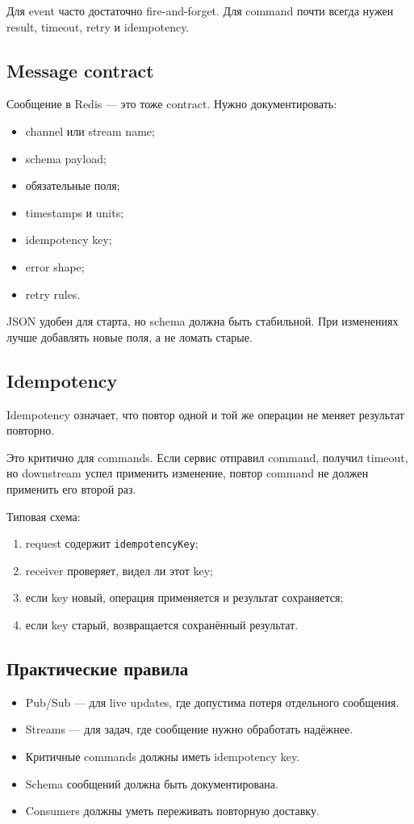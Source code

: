 \documentclass[12pt,a4paper]{article}
\begin{document}
Для event часто достаточно fire-and-forget. Для command почти всегда нужен result,
timeout, retry и idempotency.

\subsection{Message contract}

Сообщение в Redis --- это тоже contract. Нужно документировать:
\begin{itemize}
    \item channel или stream name;
    \item schema payload;
    \item обязательные поля;
    \item timestamps и units;
    \item idempotency key;
    \item error shape;
    \item retry rules.
\end{itemize}

JSON удобен для старта, но schema должна быть стабильной. При изменениях лучше
добавлять новые поля, а не ломать старые.

\subsection{Idempotency}

Idempotency означает, что повтор одной и той же операции не меняет результат
повторно.

Это критично для commands. Если сервис отправил command, получил timeout, но
downstream успел применить изменение, повтор command не должен применить его
второй раз.

Типовая схема:
\begin{enumerate}
    \item request содержит \texttt{idempotencyKey};
    \item receiver проверяет, видел ли этот key;
    \item если key новый, операция применяется и результат сохраняется;
    \item если key старый, возвращается сохранённый результат.
\end{enumerate}

\subsection{Практические правила}

\begin{itemize}
    \item Pub/Sub --- для live updates, где допустима потеря отдельного сообщения.
    \item Streams --- для задач, где сообщение нужно обработать надёжнее.
    \item Критичные commands должны иметь idempotency key.
    \item Schema сообщений должна быть документирована.
    \item Consumers должны уметь переживать повторную доставку.
\end{itemize}
\end{document}
